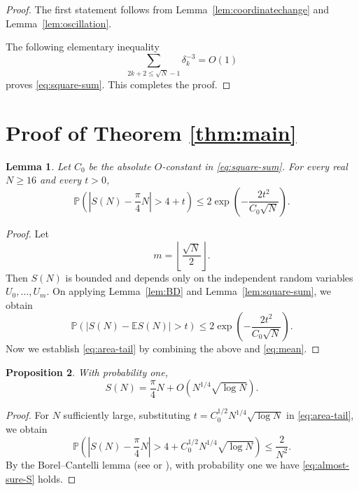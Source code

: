 \documentclass[12pt,reqno]{amsart}
\theoremstyle{plain}
\newtheorem{lemma}{Lemma}[section]
\newtheorem{proposition}[lemma]{Proposition}
\theoremstyle{definition}
\newcommand{\E}{\mathbb E}
\newcommand{\Prob}{\mathbb P}
\begin{document}
\begin{proof}The first statement follows from
Lemma~\ref{lem:coordinatechange} and Lemma~\ref{lem:oscillation}.

The following elementary inequality
\begin{equation*}
 \sum_{2k+2\le \sqrt{N}-1}\delta_k^{-3}=O(1)
\end{equation*}proves \eqref{eq:square-sum}. This completes the proof.
\end{proof}


\section{Proof of Theorem \ref{thm:main}}


\setcounter{equation}{0}

\begin{lemma}\label{lem:tail}Let $C_0$ be the absolute $O$-constant in \eqref{eq:square-sum}.
For every real $N\ge16$ and every $t>0$,
\begin{equation}\label{eq:area-tail}
 \Prob\!\left(\left|S(N)-\frac{\pi}{4}N\right|>4+t\right)
 \le2\exp\!\left(-\frac{2t^2}{C_0\sqrt N}\right).
\end{equation}
\end{lemma}
\begin{proof} Let 
$$m=\left\lfloor\frac{\sqrt{N}}{2}\right\rfloor.$$
Then $S(N)$ is bounded and depends only
on the independent random variables $U_{0},\ldots,U_{m}$. 
On applying Lemma~\ref{lem:BD} and Lemma~\ref{lem:square-sum}, we obtain 
\begin{equation*}
 \Prob(|S(N)-\E S(N)|>t)
 \le2\exp\!\left(-\frac{2t^2}{C_0\sqrt N}\right).
\end{equation*}
Now we establish \eqref{eq:area-tail} by combining the above and \eqref{eq:mean}.
\end{proof}

\begin{proposition}\label{prop:almost-sure}
With probability one,
\begin{equation}\label{eq:almost-sure-S}
 S(N)=\frac{\pi}{4}N+
 O\!\left(N^{1/4}\sqrt{\log N}\right).
\end{equation}
\end{proposition}

\begin{proof}
For $N$ sufficiently large, substituting
$t=C_0^{1/2}N^{1/4}\sqrt{\log N}$ in \eqref{eq:area-tail}, we obtain
\begin{equation*}
 \Prob\!\left(\left|S(N)-\frac{\pi}{4}N\right|>4+C_0^{1/2}N^{1/4}\sqrt{\log N}\right)
 \le\frac{2}{N^2}.
\end{equation*}
By the Borel--Cantelli lemma (see \cite[Lemma 8.6.1]{AS} or \cite[Lemma 1.2]{TV}), with probability one we have \eqref{eq:almost-sure-S} holds.
\end{proof}
\end{document}
